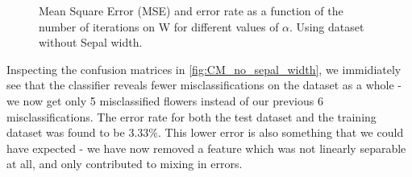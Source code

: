 \documentclass{article}
\begin{document}
\begin{figure}
    \centering
    \caption{Mean Square Error (MSE) and error rate as a function of the number of iterations on W
    for different values of $\alpha$. Using dataset without Sepal width.}
\end{figure}

Inspecting the confusion matrices in \autoref{fig:CM_no_sepal_width}, we immidiately see that
the classifier reveals fewer misclassifications on the dataset as a whole - we now get only
5 misclassified flowers instead of our previous 6 misclassifications. The error rate for both
the test dataset and the training dataset was found to be $3.33\%$. This lower error is also
something that we could have expected - we have now removed a feature which was not linearly
separable at all, and only contributed to mixing in errors.
\end{document}
